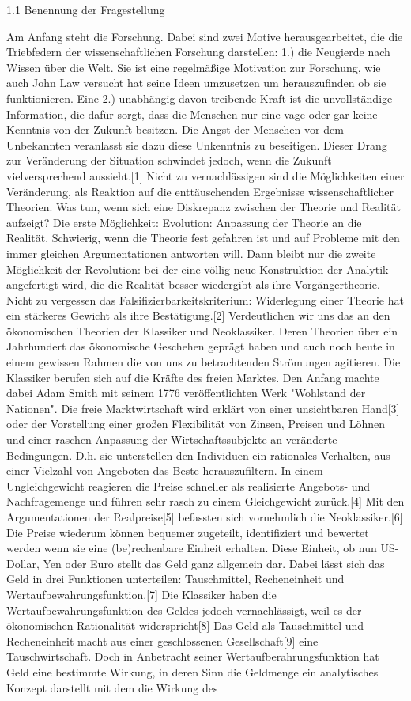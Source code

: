 1.1 Benennung der Fragestellung

Am Anfang steht die Forschung. Dabei sind zwei Motive herausgearbeitet, die die Triebfedern der wissenschaftlichen Forschung darstellen:
1.) die Neugierde nach Wissen über die Welt. Sie ist eine regelmäßige Motivation zur Forschung, wie auch John Law versucht hat seine Ideen umzusetzen um herauszufinden ob sie funktionieren.
Eine 2.) unabhängig davon treibende Kraft ist die unvollständige Information, die dafür sorgt, dass die Menschen nur eine vage oder gar keine Kenntnis von der Zukunft besitzen. Die Angst der Menschen vor dem Unbekannten veranlasst sie dazu diese Unkenntnis zu beseitigen. Dieser Drang zur Veränderung der Situation schwindet jedoch, wenn die Zukunft vielversprechend aussieht.[1] Nicht zu vernachlässigen sind die Möglichkeiten einer Veränderung, als Reaktion auf die enttäuschenden Ergebnisse wissenschaftlicher Theorien. Was tun, wenn sich eine Diskrepanz zwischen der Theorie und Realität aufzeigt? Die erste Möglichkeit: Evolution: Anpassung der Theorie an die Realität. Schwierig, wenn die Theorie fest gefahren ist und auf Probleme mit den immer gleichen Argumentationen antworten will. Dann bleibt nur die zweite Möglichkeit der Revolution: bei der eine völlig neue Konstruktion der Analytik angefertigt wird, die die Realität besser wiedergibt als ihre Vorgängertheorie. Nicht zu vergessen das Falsifizierbarkeitskriterium: Widerlegung einer Theorie hat ein stärkeres Gewicht als ihre Bestätigung.[2] Verdeutlichen wir uns das an den ökonomischen Theorien der Klassiker und Neoklassiker. Deren Theorien über ein Jahrhundert das ökonomische Geschehen geprägt haben und auch noch heute in einem gewissen Rahmen die von uns zu betrachtenden Strömungen agitieren. Die Klassiker berufen sich auf die Kräfte des freien Marktes. Den Anfang machte dabei Adam Smith mit seinem 1776 veröffentlichten Werk "Wohlstand der Nationen". Die freie Marktwirtschaft wird erklärt von einer unsichtbaren Hand[3] oder der Vorstellung einer großen Flexibilität von Zinsen, Preisen und Löhnen und einer raschen Anpassung der Wirtschaftssubjekte an veränderte Bedingungen. D.h. sie unterstellen den Individuen ein rationales Verhalten, aus einer Vielzahl von Angeboten das Beste herauszufiltern. In einem Ungleichgewicht reagieren die Preise schneller als realisierte Angebots- und Nachfragemenge und führen sehr rasch zu einem Gleichgewicht zurück.[4] Mit den Argumentationen der Realpreise[5] befassten sich vornehmlich die Neoklassiker.[6] Die Preise wiederum können bequemer zugeteilt, identifiziert und bewertet werden wenn sie eine (be)rechenbare Einheit erhalten. Diese Einheit, ob nun US-Dollar, Yen oder Euro stellt das Geld ganz allgemein dar. Dabei lässt sich das Geld in drei Funktionen unterteilen: Tauschmittel, Recheneinheit und Wertaufbewahrungsfunktion.[7] Die Klassiker haben die Wertaufbewahrungsfunktion des Geldes jedoch vernachlässigt, weil es der ökonomischen Rationalität widerspricht[8] Das Geld als Tauschmittel und Recheneinheit macht aus einer geschlossenen Gesellschaft[9] eine Tauschwirtschaft. Doch in Anbetracht seiner Wertaufberahrungsfunktion hat Geld eine bestimmte Wirkung, in deren Sinn die Geldmenge ein analytisches Konzept darstellt mit dem die Wirkung des 